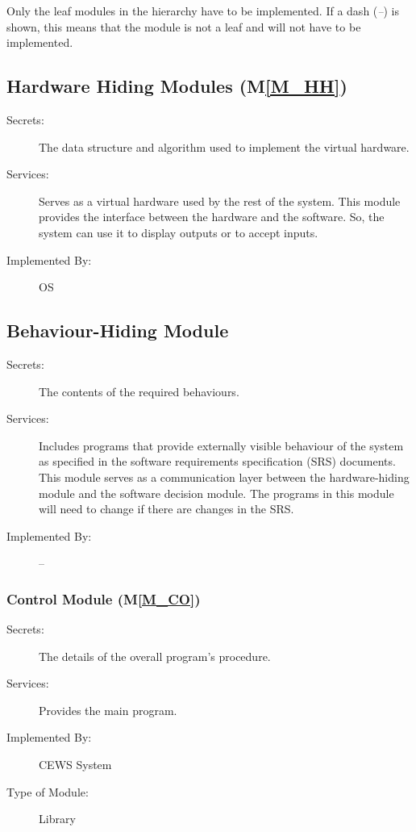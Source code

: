 \documentclass[12pt, titlepage]{article}
\newcommand{\mref}[1]{M\ref{#1}}
\begin{document}
Only the leaf modules in the hierarchy have to be implemented. If a dash
(\emph{--}) is shown, this means that the module is not a leaf and will not have
to be implemented.

\subsection{Hardware Hiding Modules (\mref{M_HH})}

\begin{description}
\item[Secrets:]The data structure and algorithm used to implement the virtual
  hardware.
\item[Services:]Serves as a virtual hardware used by the rest of the
  system. This module provides the interface between the hardware and the
  software. So, the system can use it to display outputs or to accept inputs.
\item[Implemented By:] OS
\end{description}

\subsection{Behaviour-Hiding Module}

\begin{description}
\item[Secrets:]The contents of the required behaviours.
\item[Services:]Includes programs that provide externally visible behaviour of
  the system as specified in the software requirements specification (SRS)
  documents. This module serves as a communication layer between the
  hardware-hiding module and the software decision module. The programs in this
  module will need to change if there are changes in the SRS.
\item[Implemented By:] --
\end{description}

\subsubsection{Control Module (\mref{M_CO})}

\begin{description}
\item[Secrets:] The details of the overall program's procedure.
\item[Services:] Provides the main program.
\item[Implemented By:] CEWS System
\item[Type of Module:] Library
\end{description}
\end{document}
